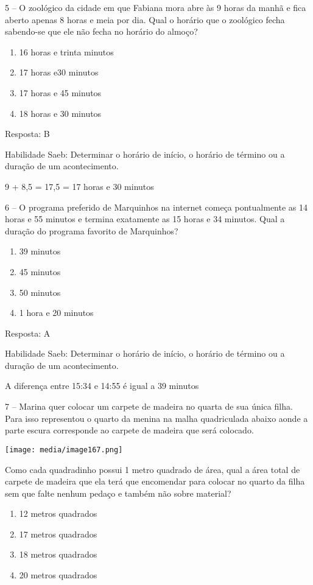 5 -- O zoológico da cidade em que Fabiana mora abre às 9 horas da manhã
e fica aberto apenas 8 horas e meia por dia. Qual o horário que o
zoológico fecha sabendo-se que ele não fecha no horário do almoço?

\begin{enumerate}
\def\labelenumi{\alph{enumi})}
\item
  16 horas e trinta minutos
\item
  17 horas e30 minutos
\item
  17 horas e 45 minutos
\item
  18 horas e 30 minutos
\end{enumerate}

Resposta: B

Habilidade Saeb: Determinar o horário de início, o horário de término ou
a duração de um acontecimento.

9 + 8,5 = 17,5 = 17 horas e 30 minutos

6 -- O programa preferido de Marquinhos na internet começa pontualmente
as 14 horas e 55 minutos e termina exatamente as 15 horas e 34 minutos.
Qual a duração do programa favorito de Marquinhos?

\begin{enumerate}
\def\labelenumi{\alph{enumi})}
\item
  39 minutos
\item
  45 minutos
\item
  50 minutos
\item
  1 hora e 20 minutos
\end{enumerate}

Resposta: A

Habilidade Saeb: Determinar o horário de início, o horário de término ou
a duração de um acontecimento.

A diferença entre 15:34 e 14:55 é igual a 39 minutos

7 -- Marina quer colocar um carpete de madeira no quarta de sua única
filha. Para isso representou o quarto da menina na malha quadriculada
abaixo aonde a parte escura corresponde ao carpete de madeira que será
colocado.

\texttt{[image: media/image167.png]}

Como cada quadradinho possui 1 metro quadrado de área, qual a área total
de carpete de madeira que ela terá que encomendar para colocar no quarto
da filha sem que falte nenhum pedaço e também não sobre material?

\begin{enumerate}
\def\labelenumi{\alph{enumi})}
\item
  12 metros quadrados
\item
  17 metros quadrados
\item
  18 metros quadrados
\item
  20 metros quadrados
\end{enumerate}

